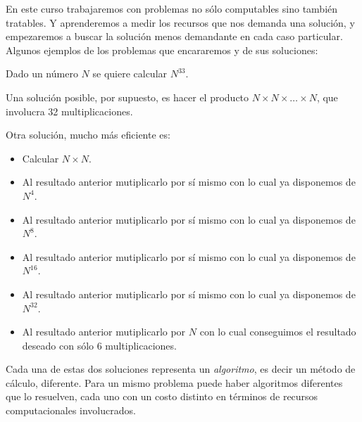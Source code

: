 En este curso trabajaremos con problemas no sólo computables sino
también tratables. Y aprenderemos a medir los recursos que nos
demanda una solución, y empezaremos a buscar la solución menos
demandante en cada caso particular. \\

Algunos ejemplos de los problemas que encararemos y de sus
soluciones:

\begin{problemac}
Dado un número $N$ se quiere calcular $N^{33}$.
\end{problemac}

Una solución posible, por supuesto, es hacer el producto $N \times
N \times \ldots \times N$, que involucra 32 multiplicaciones.

Otra solución, mucho más eficiente es:
\begin{itemize}
\item Calcular $N \times N$.

\item Al resultado anterior mutiplicarlo por sí mismo con lo cual
ya disponemos de $N^{4}$.

\item Al resultado anterior mutiplicarlo por sí mismo con lo cual
ya disponemos de $N^{8}$.

\item Al resultado anterior mutiplicarlo por sí mismo con lo cual
ya disponemos de $N^{16}$.

\item Al resultado anterior mutiplicarlo por sí mismo con lo cual
ya disponemos de $N^{32}$.

\item Al resultado anterior mutiplicarlo por $N$ con lo cual
conseguimos el resultado deseado con sólo 6 multiplicaciones.

\end{itemize}

Cada una de estas dos soluciones representa un {\it algoritmo}, es
decir un método de cálculo, diferente. Para un mismo problema
puede haber algoritmos diferentes que lo resuelven, cada uno con
un costo distinto en términos de recursos computacionales
involucrados.


